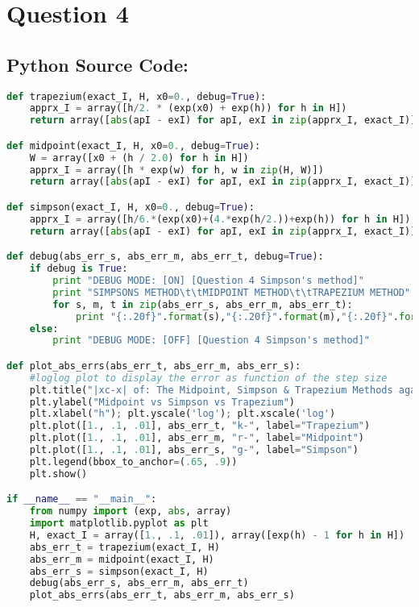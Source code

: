 \documentclass{article}
\begin{document}
\section*{Question 4}
\subsection*{Python Source Code: }
\begin{lstlisting}[language=Python]
def trapezium(exact_I, H, x0=0., debug=True):
    apprx_I = array([h/2. * (exp(x0) + exp(h)) for h in H])
    return array([abs(apI - exI) for apI, exI in zip(apprx_I, exact_I)])

def midpoint(exact_I, H, x0=0., debug=True):
    W = array([x0 + (h / 2.0) for h in H])
    apprx_I = array([h * exp(w) for h, w in zip(H, W)])
    return array([abs(apI - exI) for apI, exI in zip(apprx_I, exact_I)])

def simpson(exact_I, H, x0=0., debug=True):
    apprx_I = array([h/6.*(exp(x0)+(4.*exp(h/2.))+exp(h)) for h in H])
    return array([abs(apI - exI) for apI, exI in zip(apprx_I, exact_I)])

def debug(abs_err_s, abs_err_m, abs_err_t, debug=True):
    if debug is True:
        print "DEBUG MODE: [ON] [Question 4 Simpson's method]"
        print "SIMPSONS METHOD\t\tMIDPOINT METHOD\t\tTRAPEZIUM METHOD"
        for s, m, t in zip(abs_err_s, abs_err_m, abs_err_t):
            print "{:.20f}".format(s),"{:.20f}".format(m),"{:.20f}".format(t)
    else:
        print "DEBUG MODE: [OFF] [Question 4 Simpson's method]"

def plot_abs_errs(abs_err_t, abs_err_m, abs_err_s):
    #loglog plot to display the error as function of the step size
    plt.title("|xc-x| of: The Midpoint, Simpson & Trapezium Methods against h")
    plt.ylabel("Midpoint vs Simpson vs Trapezium")
    plt.xlabel("h"); plt.yscale('log'); plt.xscale('log')
    plt.plot([1., .1, .01], abs_err_t, "k-", label="Trapezium")
    plt.plot([1., .1, .01], abs_err_m, "r-", label="Midpoint")
    plt.plot([1., .1, .01], abs_err_s, "g-", label="Simpson")
    plt.legend(bbox_to_anchor=(.65, .9))
    plt.show()

if __name__ == "__main__":
    from numpy import (exp, abs, array)
    import matplotlib.pyplot as plt
    H, exact_I = array([1., .1, .01]), array([exp(h) - 1 for h in H])
    abs_err_t = trapezium(exact_I, H)
    abs_err_m = midpoint(exact_I, H)
    abs_err_s = simpson(exact_I, H)
    debug(abs_err_s, abs_err_m, abs_err_t)
    plot_abs_errs(abs_err_t, abs_err_m, abs_err_s)
\end{lstlisting}
\end{document}

